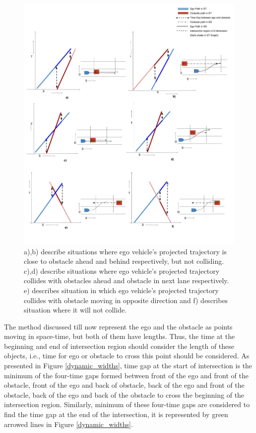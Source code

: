 \begin{figure}
	\centering
	\includegraphics[width=1.1\textwidth]{Images/concept/dynamic_collision_lines.jpg}
	\caption{a),b) describe situations where ego vehicle's projected trajectory is close to obstacle ahead and behind respectively, but not colliding. \newline 
		c),d) describe situations where ego vehicle's projected trajectory collides with obstacles ahead and obstacle in next lane respectively. \newline
		e) describes situation in which ego vehicle's projected trajectory collides with obstacle moving in opposite direction and f) describes situation where it will not collide. 
	}
	\label{dynamic_obst_all}
\end{figure}

The method discussed till now represent the ego and the obstacle as points moving in space-time, but both of them have lengths. Thus, the time at the beginning and end of intersection region should consider the length of these objects, i.e., time for ego or obstacle to cross this point should be considered. As presented in Figure \ref{dynamic_widths}, time gap at the start of intersection is the minimum of the four-time gaps formed between front of the ego and front of the obstacle, front of the ego and back of obstacle, back of the ego and front of the obstacle, back of the ego and back of the obstacle to cross the beginning of the intersection region. Similarly, minimum of these four-time gaps are considered to find the time gap at the end of the intersection, it is represented by green arrowed lines in Figure \ref{dynamic_widths}.

